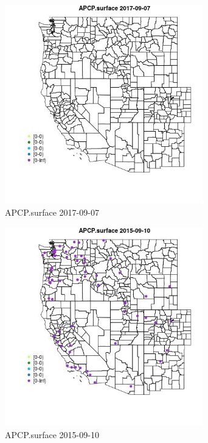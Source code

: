 \begin{figure} 
\centering  
\includegraphics[width=0.77\textwidth]{Code_Outputs/Report_ML_input_PM25_Step4_part_e_de_duplicated_aveswNAs_MapObsAPCPsurface2017-09-07.jpg} 
\caption{\label{fig:Report_ML_input_PM25_Step4_part_e_de_duplicated_aveswNAsMapObsAPCPsurface2017-09-07}APCP.surface 2017-09-07} 
\end{figure} 
 

\begin{figure} 
\centering  
\includegraphics[width=0.77\textwidth]{Code_Outputs/Report_ML_input_PM25_Step4_part_e_de_duplicated_aveswNAs_MapObsAPCPsurface2015-09-10.jpg} 
\caption{\label{fig:Report_ML_input_PM25_Step4_part_e_de_duplicated_aveswNAsMapObsAPCPsurface2015-09-10}APCP.surface 2015-09-10} 
\end{figure} 
 

